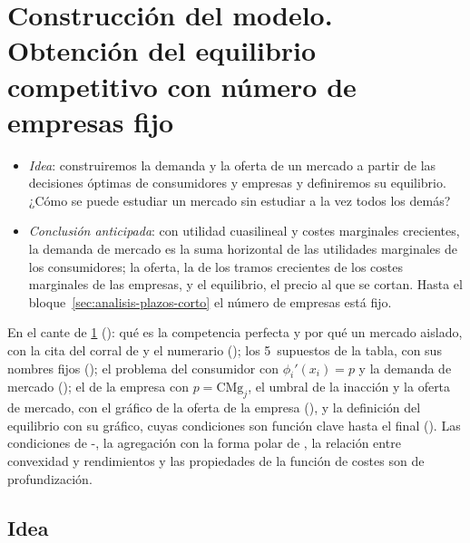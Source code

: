 \documentclass[11pt]{article}
\begin{document}
\section{Construcción del modelo. Obtención del equilibrio\cortetitulo{} competitivo con número de empresas fijo}\label{sec:construccion-modelo-obtencion}

\begin{itemize}
\item \emph{Idea}: construiremos la demanda y la oferta de un mercado a partir de las decisiones óptimas de consumidores y empresas y definiremos su equilibrio. ¿Cómo se puede estudiar un mercado sin estudiar a la vez todos los demás?
\item \emph{Conclusión anticipada}: con utilidad cuasilineal y costes marginales crecientes, la demanda de mercado es la suma horizontal de las utilidades marginales de los consumidores; la oferta, la de los tramos crecientes de los costes marginales de las empresas, y el equilibrio, el precio al que se cortan. Hasta el bloque~\ref{sec:analisis-plazos-corto} el número de empresas está fijo.
\end{itemize}

\begin{notaopositor}
En el cante de \ref{sec:construccion-modelo-obtencion} (): qué es la competencia perfecta y por qué un mercado aislado, con la cita del corral de  y el numerario (); los 5~supuestos de la tabla, con sus nombres fijos (); el problema del consumidor con $\phi_i'(x_i)=p$ y la demanda de mercado (); el de la empresa con $p=\mathrm{CMg}_j$, el umbral de la inacción y la oferta de mercado, con el gráfico de la oferta de la empresa (), y la definición del equilibrio con su gráfico, cuyas condiciones son función clave hasta el final (). Las condiciones de -, la agregación con la forma polar de , la relación entre convexidad y rendimientos y las propiedades de la función de costes son de profundización.
\end{notaopositor}

\subsection{Idea}\label{sec:idea}
\end{document}
